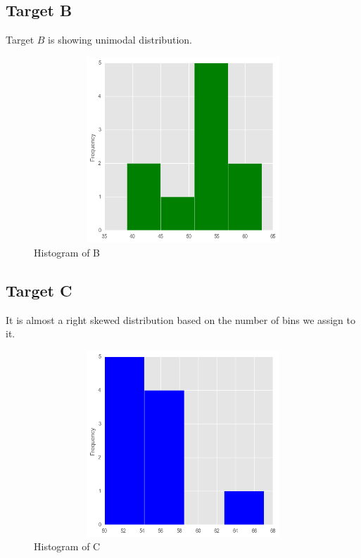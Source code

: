 \documentclass[11pt]{report}
\begin{document}
\subsection{Target B}
Target $B$ is showing unimodal distribution.
\begin{figure}[h!]
  \centering
  \includegraphics[height = 7cm, width = 14cm]{B_hist.png}
  \caption{Histogram of B}
  \label{fig:hist_b}
\end{figure}

\subsection{Target C}
It is almost a right skewed distribution based on the number of bins we assign to it.
\begin{center}
\begin{figure}[h!]
  \centering
  \includegraphics[height = 7cm, width = 14cm]{C_hist.png}
  \caption{Histogram of C}
  \label{fig:hist_c}
\end{figure} 
\end{center}
\end{document}
